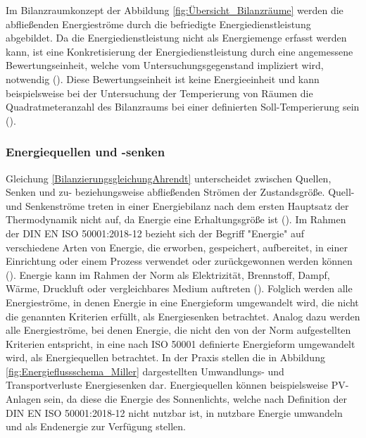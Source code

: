 Im Bilanzraumkonzept der Abbildung \eqref{fig:Übersicht_Bilanzräume} werden die abfließenden Energieströme durch die befriedigte Energiedienstleistung abgebildet.
Da die Energiedienstleistung nicht als Energiemenge erfasst werden kann, ist eine Konkretisierung der Energiedienstleistung durch eine angemessene Bewertungseinheit, 
welche vom Untersuchungsgegenstand impliziert wird, notwendig (\cite{Miller.2016}). 
Diese Bewertungseinheit ist keine Energieeinheit und kann beispielsweise bei der Untersuchung der Temperierung 
von Räumen die Quadratmeteranzahl des Bilanzraums bei einer definierten Soll-Temperierung sein (\cite{Miller.2016}). 


\subsubsection{Energiequellen und -senken}
Gleichung \eqref{BilanzierungsgleichungAhrendt} unterscheidet zwischen Quellen, Senken und zu- beziehungsweise abfließenden Strömen der Zustandsgröße.
Quell- und Senkenströme treten in einer Energiebilanz nach dem ersten Hauptsatz der Thermodynamik nicht auf, da Energie eine Erhaltungsgröße ist (\cite[S. 14]{Ahrendts.2014}).
Im Rahmen der DIN EN ISO 50001:2018-12 bezieht sich der Begriff "Energie" auf verschiedene Arten von Energie, die erworben, gespeichert, aufbereitet, in einer Einrichtung oder einem Prozess verwendet
oder zurückgewonnen werden können (\cite[Kapitel 3.5.1]{DIN50001.2018}). Energie kann im Rahmen der Norm als Elektrizität, Brennstoff, Dampf, Wärme, Druckluft oder vergleichbares Medium auftreten
(\cite[Kapitel 3.5.1]{DIN50001.2018}).
Folglich werden alle Energieströme, in denen Energie in eine Energieform umgewandelt wird, die nicht die genannten Kriterien erfüllt, als Energiesenken betrachtet.
Analog dazu werden alle Energieströme, bei denen Energie, die nicht den von der Norm aufgestellten Kriterien entspricht, in eine nach ISO 50001 definierte Energieform
umgewandelt wird, als Energiequellen betrachtet.
In der Praxis stellen die in Abbildung \eqref{fig:Energieflussschema_Miller} dargestellten Umwandlungs- und Transportverluste Energiesenken dar. Energiequellen können beispielsweise
PV-Anlagen sein, da diese die Energie des Sonnenlichts, welche nach Definition der DIN EN ISO 50001:2018-12 nicht nutzbar ist, in nutzbare Energie umwandeln und als
Endenergie zur Verfügung stellen.

